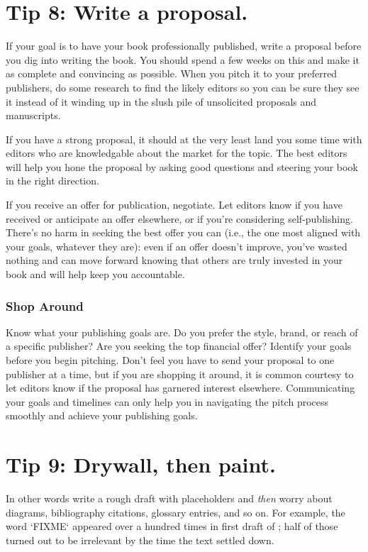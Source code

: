 \documentclass[10pt,letterpaper]{article}
\begin{document}
\section*{Tip 8: Write a proposal.}

If your goal is to have your book professionally published,
write a proposal before you dig into writing the book.
You should spend a few weeks on this
and make it as complete and convincing as possible.
When you pitch it to your preferred publishers,
do some research to find the likely editors
so you can be sure they see it
instead of it winding up in the slush pile of unsolicited proposals and manuscripts.

If you have a strong proposal,
it should at the very least land you some time with editors
who are knowledgable about the market for the topic.
The best editors will help you hone the proposal
by asking good questions and steering your book in the right direction.

If you receive an offer for publication, negotiate.
Let editors know if you have received or anticipate an offer elsewhere, 
or if you're considering self-publishing.
There's no harm in seeking the best offer you can (i.e., the one
most aligned with your goals, whatever they are):
even if an offer doesn't improve, you've wasted nothing
and can move forward knowing that others are truly invested in your book
and will help keep you accountable.

\subsubsection*{Shop Around}

Know what your publishing goals are.
Do you prefer the style, brand, or reach of a specific publisher?
Are you seeking the top financial offer?
Identify your goals before you begin pitching.
Don't feel you have to send your proposal to one publisher at a time,
but if you are shopping it around,
it is common courtesy to let editors know if the proposal has garnered interest elsewhere.
Communicating your goals and timelines can only help you
in navigating the pitch process smoothly and achieve your publishing goals. 

\section*{Tip 9: Drywall, then paint.}

In other words write a rough draft with placeholders
and \emph{then} worry about diagrams, bibliography citations, glossary entries, and so on.
For example,
the word `FIXME` appeared over a hundred times in first draft of \cite{Wi2019};
half of those turned out to be irrelevant by the time the text settled down.
\end{document}
